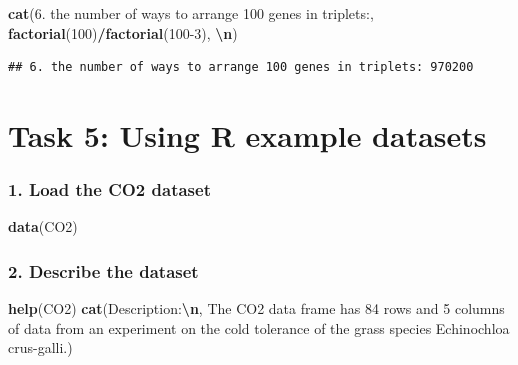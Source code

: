 \documentclass[
]{article}
\newenvironment{Shaded}{\begin{snugshade}}{\end{snugshade}}
\newcommand{\DecValTok}[1]{\textcolor[rgb]{0.00,0.00,0.81}{#1}}
\newcommand{\FunctionTok}[1]{\textcolor[rgb]{0.13,0.29,0.53}{\textbf{#1}}}
\newcommand{\NormalTok}[1]{#1}
\newcommand{\SpecialCharTok}[1]{\textcolor[rgb]{0.81,0.36,0.00}{\textbf{#1}}}
\newcommand{\StringTok}[1]{\textcolor[rgb]{0.31,0.60,0.02}{#1}}
\begin{document}
\begin{Shaded}
\begin{Highlighting}[]
\FunctionTok{cat}\NormalTok{(}\StringTok{\textquotesingle{}6. the number of ways to arrange 100 genes in triplets:\textquotesingle{}}\NormalTok{, }\FunctionTok{factorial}\NormalTok{(}\DecValTok{100}\NormalTok{)}\SpecialCharTok{/}\FunctionTok{factorial}\NormalTok{(}\DecValTok{100{-}3}\NormalTok{), }\StringTok{\textquotesingle{}}\SpecialCharTok{\textbackslash{}n}\StringTok{\textquotesingle{}}\NormalTok{)}
\end{Highlighting}
\end{Shaded}

\begin{verbatim}
## 6. the number of ways to arrange 100 genes in triplets: 970200
\end{verbatim}

\section{Task 5: Using R example
datasets}\label{task-5-using-r-example-datasets}

\subsubsection{1. Load the CO2 dataset}\label{load-the-co2-dataset}

\begin{Shaded}
\begin{Highlighting}[]
\FunctionTok{data}\NormalTok{(}\StringTok{\textquotesingle{}CO2\textquotesingle{}}\NormalTok{)}
\end{Highlighting}
\end{Shaded}

\subsubsection{2. Describe the dataset}\label{describe-the-dataset}

\begin{Shaded}
\begin{Highlighting}[]
\FunctionTok{help}\NormalTok{(CO2)}
\FunctionTok{cat}\NormalTok{(}\StringTok{\textquotesingle{}Description:}\SpecialCharTok{\textbackslash{}n}\StringTok{\textquotesingle{}}\NormalTok{, }\StringTok{\textquotesingle{}The CO2 data frame has 84 rows and 5 columns of data from an experiment on the cold tolerance of the grass species Echinochloa crus{-}galli.\textquotesingle{}}\NormalTok{)}
\end{Highlighting}
\end{Shaded}
\end{document}
